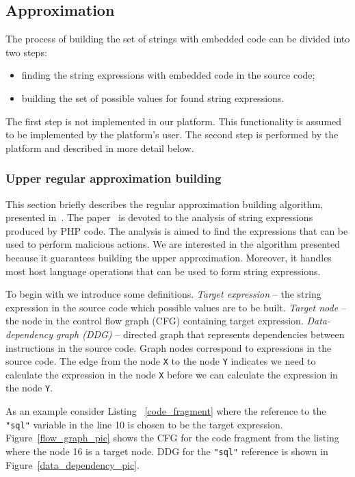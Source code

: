 \subsection{Approximation}

The process of building the set of strings with embedded code can be divided into two steps:
\begin{itemize}
\item finding the string expressions with embedded code in the source code;
\item building the set of possible values for found string expressions.
\end{itemize}

The first step is not implemented in our platform. This functionality is assumed to be implemented by the platform's user. The second step is performed by the platform and described in more detail below.

\subsubsection{Upper regular approximation building}

This section briefly describes the regular approximation building algorithm, presented in~\cite{Upper_Approximation:ref}. The paper~\cite{Upper_Approximation:ref} is devoted to the analysis of string expressions produced by PHP code. The analysis is aimed to find the expressions that can be used to perform malicious actions. We are interested in the algorithm presented because it guarantees building the upper approximation. Moreover, it handles most host language operations that can be used to form string expressions.

To begin with we introduce some definitions. \textit{Target expression} -- the string expression in the source code which possible values are to be built. \textit{Target node} -- the node in the control flow graph (CFG) containing target expression. \textit{Data-dependency graph (DDG)} -- directed graph that represents dependencies between instructions in the source code. Graph nodes correspond to expressions in the source code. The edge from the node \verb|X| to the node \verb|Y| indicates we need to calculate the expression in the node \verb|X| before we can calculate the expression in the node \verb|Y|.

As an example consider Listing ~\ref{code_fragment} where the reference to the \verb|"sql"| variable in the line 10 is chosen to be the target expression. Figure~\ref{flow_graph_pic} shows the CFG for the code fragment from the listing where the node 16 is a target node. DDG for the \verb|"sql"| reference is shown in Figure~\ref{data_dependency_pic}.

